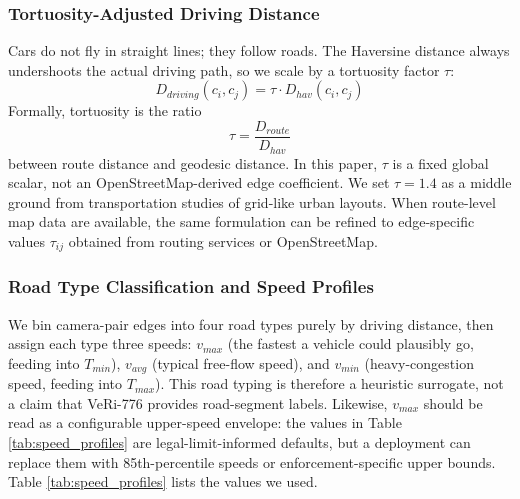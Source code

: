 \documentclass{ijitcs}
\newcommand{\rev}[1]{#1}
\begin{document}
\subsubsection{Tortuosity-Adjusted Driving Distance}
Cars do not fly in straight lines; they follow roads. The Haversine distance always undershoots the actual driving path, so we scale by a tortuosity factor $\tau$:
\begin{equation}
    D_{driving}(c_i, c_j) = \tau \cdot D_{hav}(c_i, c_j)
\label{eq:dist}
\end{equation}
\rev{Formally, tortuosity is the ratio}
\begin{equation}
    \rev{\tau = \frac{D_{route}}{D_{hav}}}
\label{eq:tau}
\end{equation}
\rev{between route distance and geodesic distance. In this paper, $\tau$ is a fixed global scalar, not an OpenStreetMap-derived edge coefficient. We set $\tau = 1.4$ as a middle ground from transportation studies of grid-like urban layouts. When route-level map data are available, the same formulation can be refined to edge-specific values $\tau_{ij}$ obtained from routing services or OpenStreetMap.}

\subsubsection{Road Type Classification and Speed Profiles}
We bin camera-pair edges into four road types purely by driving distance, then assign each type three speeds: $v_{max}$ (the fastest a vehicle could plausibly go, feeding into $T_{min}$), $v_{avg}$ (typical free-flow speed), and $v_{min}$ (heavy-congestion speed, feeding into $T_{max}$). \rev{This road typing is therefore a heuristic surrogate, not a claim that VeRi-776 provides road-segment labels. Likewise, $v_{max}$ should be read as a configurable upper-speed envelope: the values in Table \ref{tab:speed_profiles} are legal-limit-informed defaults, but a deployment can replace them with 85th-percentile speeds or enforcement-specific upper bounds.} Table \ref{tab:speed_profiles} lists the values we used.
\end{document}
